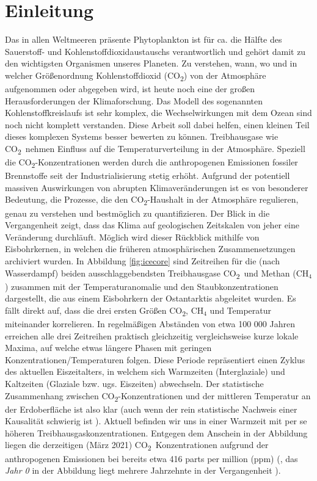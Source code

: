 \documentclass[12pt,a4paper,onecolumn]{scrartcl}
\newcommand{\cotwo}{CO\textsubscript{2}}
\begin{document}
\section{Einleitung} \label{sec:einleitung}
\sloppy %
Das in allen Weltmeeren präsente Phytoplankton ist für ca. die Hälfte des Sauerstoff- und Kohlenstoffdioxidaustauschs verantwortlich \citep{Emerson.2009} und gehört damit zu den wichtigsten Organismen unseres Planeten. Zu verstehen, wann, wo und in welcher Größenordnung Kohlenstoffdioxid (\cotwo) von der Atmosphäre aufgenommen oder abgegeben wird, ist heute noch eine der großen Herausforderungen der Klimaforschung. Das Modell des sogenannten Kohlenstoffkreislaufs ist sehr komplex, die Wechselwirkungen mit dem Ozean sind noch nicht komplett verstanden. Diese Arbeit soll dabei helfen, einen kleinen Teil dieses komplexen Systems besser bewerten zu können. Treibhausgase wie \cotwo \ nehmen Einfluss auf die Temperaturverteilung in der Atmosphäre. Speziell die \cotwo -Konzentrationen werden durch die anthropogenen Emissionen fossiler Brennstoffe seit der Industrialisierung stetig erhöht. Aufgrund der potentiell massiven Auswirkungen von abrupten Klimaveränderungen \citep{IPCCpol.2018} ist es von besonderer Bedeutung, die Prozesse, die den \cotwo -Haushalt in der Atmosphäre regulieren, genau zu verstehen und bestmöglich zu quantifizieren.  Der Blick in die Vergangenheit zeigt, dass das Klima auf geologischen Zeitskalen von jeher eine Veränderung durchläuft. Möglich wird dieser Rückblick mithilfe von Eisbohrkernen, in welchen die früheren atmosphärischen Zusammensetzungen archiviert wurden. In Abbildung \ref{fig:icecore} sind  Zeitreihen für die (nach Wasserdampf) beiden ausschlaggebendsten Treibhausgase \cotwo \ und Methan (CH$_4$) zusammen mit der Temperaturanomalie und den Staubkonzentrationen dargestellt, die aus einem Eisbohrkern der Ostantarktis abgeleitet wurden. Es fällt direkt auf, dass die drei ersten Größen \cotwo , CH$_4$ und Temperatur miteinander korrelieren. In regelmäßigen Abständen von etwa 100 000 Jahren erreichen alle drei Zeitreihen praktisch gleichzeitig vergleichsweise kurze lokale Maxima, auf welche etwas längere Phasen mit geringen Konzentrationen/Temperaturen folgen. Diese Periode repräsentiert einen Zyklus des aktuellen Eiszeitalters, in welchem sich Warmzeiten (Interglaziale) und Kaltzeiten (Glaziale bzw. ugs. Eiszeiten) abwechseln. Der statistische Zusammenhang zwischen \cotwo -Konzentrationen und der mittleren Temperatur an der Erdoberfläche ist also klar (auch wenn der rein statistische Nachweis einer Kausalität schwierig ist \citep{Stips.2016}). Aktuell befinden wir uns in einer Warmzeit mit per se höheren Treibhausgaskonzentrationen. Entgegen dem Anschein in der Abbildung liegen die derzeitigen (März 2021) \cotwo \ Konzentrationen aufgrund der anthropogenen Emissionen bei bereits etwa 416 parts per million (ppm) (\cite{NASA.06.05.2021}, das \textit{Jahr 0} in der Abbildung liegt mehrere Jahrzehnte in der Vergangenheit \citep{Luthi.2008}). \linebreak
\end{document}
